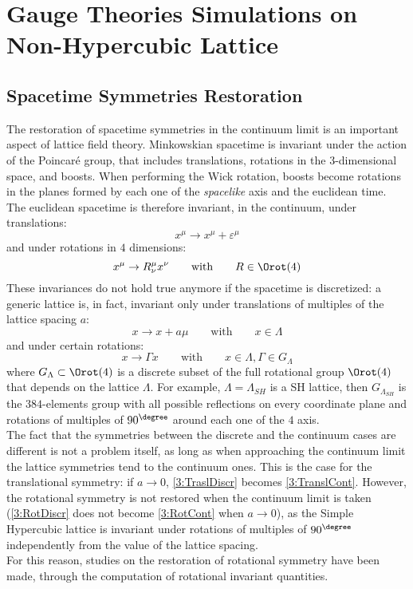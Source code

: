 \pagestyle{myFancy}
\chapter{Gauge Theories Simulations on Non-Hypercubic Lattice}

\section{Spacetime Symmetries Restoration}
The restoration of spacetime symmetries in the continuum limit is an important aspect of lattice field theory.
Minkowskian spacetime is invariant under the action of the Poincaré group, that includes translations, rotations in the $3$-dimensional space, and boosts.
When performing the Wick rotation, boosts become rotations in the planes formed by each one of the \emph{spacelike} axis and the euclidean time.
The euclidean spacetime is therefore invariant, in the continuum, under translations:
\begin{equation}
    x^\mu \to x^\mu + \varepsilon^\mu \label{3:TranslCont}
\end{equation}
and under rotations in $4$ dimensions:
\begin{equation}
    x^\mu \to R^\mu_\nu x^\nu \qquad\text{with}\qquad R\in\Orot(4) \label{3:RotCont}
\end{equation}
These invariances do not hold true anymore if the spacetime is discretized: a generic lattice is, in fact, invariant only under translations of multiples of the lattice spacing $a$:
\begin{equation}
    x \to x + a\mu \qquad\text{with}\qquad x\in\Lambda \label{3:TraslDiscr}
\end{equation}
and under certain rotations:
\begin{equation}
    x \to \Gamma x \qquad\text{with}\qquad x\in\Lambda, \Gamma\in G_\Lambda \label{3:RotDiscr}
\end{equation}
where $G_\Lambda\subset\Orot(4)$ is a discrete subset of the full rotational group $\Orot(4)$ that depends on the lattice $\Lambda$.
For example, $\Lambda=\Lambda_{SH}$ is a SH lattice, then $G_{\Lambda_{SH}}$ is the $384$-elements group with all possible reflections on every coordinate plane and rotations of multiples of $90^\degree$ around each one of the $4$ axis.\\
The fact that the symmetries between the discrete and the continuum cases are different is not a problem itself, as long as when approaching the continuum limit the lattice symmetries tend to the continuum ones.
This is the case for the translational symmetry: if $a\to0$, \eqref{3:TraslDiscr} becomes \eqref{3:TranslCont}.
However, the rotational symmetry is not restored when the continuum limit is taken (\eqref{3:RotDiscr} does not become \eqref{3:RotCont} when $a\to0$), as the Simple Hypercubic lattice is invariant under rotations of multiples of $90^\degree$ independently from the value of the lattice spacing.\\
For this reason, studies on the restoration of rotational symmetry have been made, through the computation of rotational invariant quantities.

